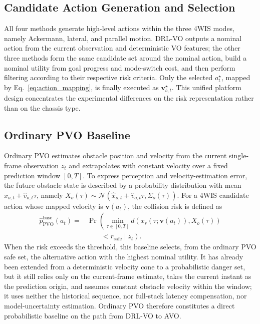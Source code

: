 \documentclass[10pt,a4paper,twocolumn]{article}
\begin{document}
\subsection{Candidate Action Generation and Selection}

All four methods generate high-level actions within the three 4WIS modes, namely Ackermann, lateral, and parallel motion. DRL-VO outputs a nominal action from the current observation and deterministic VO features; the other three methods form the same candidate set around the nominal action, build a nominal utility from goal progress and mode-switch cost, and then perform filtering according to their respective risk criteria. Only the selected $a_t^{\star}$, mapped by Eq.~\ref{eq:action_mapping}, is finally executed as $\mathbf v_{b,t}^{\star}$. This unified platform design concentrates the experimental differences on the risk representation rather than on the chassis type.

\subsection{Ordinary PVO Baseline}

Ordinary PVO estimates obstacle position and velocity from the current single-frame observation $z_t$ and extrapolates with constant velocity over a fixed prediction window $[0,T]$. To express perception and velocity-estimation error, the future obstacle state is described by a probability distribution with mean $\hat{x}_{o,t}+\hat{v}_{o,t}\tau$, namely $X_o(\tau)\sim\mathcal N(\hat{x}_{o,t}+\hat{v}_{o,t}\tau,\Sigma_o(\tau))$. For a 4WIS candidate action whose mapped velocity is $\mathbf v(a_t)$, the collision risk is defined as
\begin{equation}
\begin{aligned}
    \hat p_{\mathrm{PVO}}^{\mathrm{base}}(a_t)
    ={}& \Pr\!\left(\min_{\tau\in[0,T]}
    d\!\left(x_r(\tau;\mathbf v(a_t)),X_o(\tau)\right)\right.\\
    &\left.\qquad <r_{\mathrm{safe}}\mid z_t\right).
\end{aligned}
    \label{eq:ordinary_pvo}
\end{equation}
When the risk exceeds the threshold, this baseline selects, from the ordinary PVO safe set, the alternative action with the highest nominal utility. It has already been extended from a deterministic velocity cone to a probabilistic danger set, but it still relies only on the current-frame estimate, takes the current instant as the prediction origin, and assumes constant obstacle velocity within the window; it uses neither the historical sequence, nor full-stack latency compensation, nor model-uncertainty estimation. Ordinary PVO therefore constitutes a direct probabilistic baseline on the path from DRL-VO to AVO.
\end{document}
